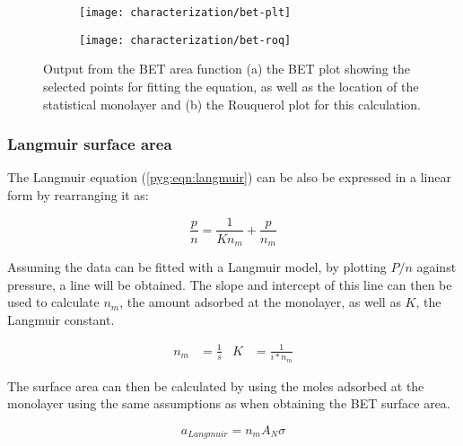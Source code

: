 \begin{figure}[h!]
	\centering

    \begin{subfigure}{0.4\linewidth}
        \parbox[c]{0.1\linewidth}{\caption{}%
            \label{pyg:fgr:betarea-plt}}
        \parbox[b]{0.7\linewidth}{%
            \texttt{[image: characterization/bet-plt]}}
    \end{subfigure}
    \begin{subfigure}{0.4\linewidth}
        \parbox[c]{0.1\linewidth}{\caption{}%
            \label{pyg:fgr:betarea-roq}}
        \parbox[b]{0.7\linewidth}{%
            \texttt{[image: characterization/bet-roq]}}
    \end{subfigure}

	\caption{Output from the BET area function (a) the BET plot showing 
	the selected points for fitting the equation, as well as the location
	of the statistical monolayer and (b) the Rouquerol plot for this 
	calculation.}%
    \label{pyg:fgr:betarea}

\end{figure}

\subsubsection{Langmuir surface area}\label{pyg:charac:langmuirarea}

The Langmuir equation (\ref{pyg:eqn:langmuir}) can be also 
be expressed in a linear form by rearranging it as:

\begin{equation}
	\frac{p}{n} = \frac{1}{K n_m} + \frac{p}{n_m}
\end{equation}

Assuming the data can be fitted with a Langmuir model, by plotting
\({P}/{n}\) against pressure, a line will be obtained. The slope and
intercept of this line can then be used to calculate \(n_{m}\),
the amount adsorbed at the monolayer, as well as \(K\), the Langmuir constant.

\begin{align}
	n_m &= \frac{1}{s} & K &= \frac{1}{i * n_m}
\end{align}

The surface area can then be calculated by using the moles adsorbed at the
monolayer using the same assumptions as when obtaining the BET surface area.

\begin{equation}
	a_{Langmuir} = n_m A_N \sigma
\end{equation}

